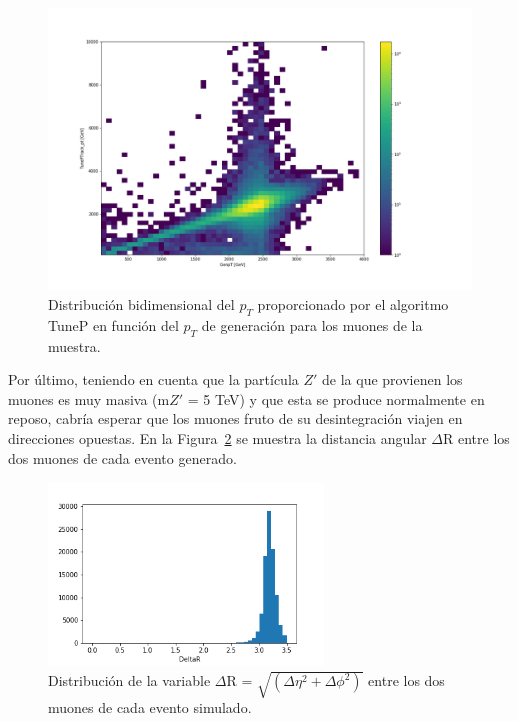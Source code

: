 \begin{figure}[h!]
\centering
\includegraphics[width=1.0\textwidth]{figures/data_tunePpt_genpt.png}
\caption{Distribuci\'on bidimensional del $p_{T}$ proporcionado por el algoritmo TuneP en funci\'on del $p_{T}$ de generaci\'on para los muones de la muestra.}
\label{fig:data_recopt_genpt}  
\end{figure}

Por \'ultimo, teniendo en cuenta que la part\'icula $Z'$ de la que provienen los muones es muy masiva (m$Z'$ = 5 TeV) y que esta se produce normalmente en reposo, cabr\'ia esperar que los muones fruto de su desintegraci\'on viajen en direcciones opuestas. En la Figura~\ref{fig:data_deltaR} se muestra la distancia angular $\Delta$R entre los dos muones de cada evento generado. \\

\begin{figure}[h!]
\centering
\includegraphics[width=0.65\textwidth]{figures/data_deltaR.png}
\caption{Distribuci\'on de la variable $\Delta$R = $\sqrt{(\Delta\eta^{2}+\Delta\phi^{2})}$ entre los dos muones de cada evento simulado.}
\label{fig:data_deltaR}  
\end{figure}

\clearpage


 
